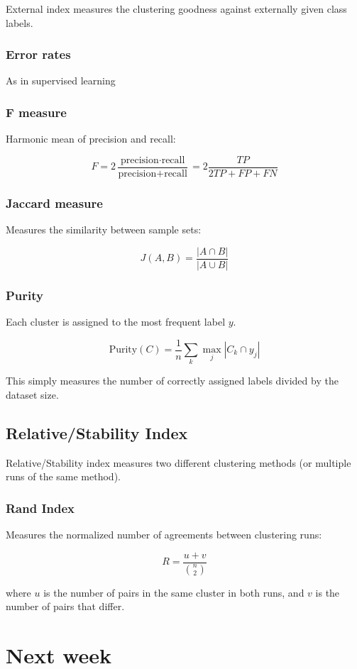 \documentclass{idc_msc}
\begin{document}
External index measures the clustering goodness against externally given class labels.

\subsubsection{Error rates}

As in supervised learning

\subsubsection{F measure}

Harmonic mean of precision and recall:

\[F = 2 \frac{\text{precision} \cdot \text{recall}}{\text{precision} + \text{recall}} = 2 \frac{TP}{2TP + FP + FN}\]

\subsubsection{Jaccard measure}

Measures the similarity between sample sets:

\[J(A,B) = \frac{|A \cap B|}{|A \cup B|}\]

\subsubsection{Purity}

Each cluster is assigned to the most frequent label \(y\).

\[\text{Purity}(C) = \frac{1}{n} \sum_k \max_j |C_k \cap y_j|\]

This simply measures the number of correctly assigned labels divided by the dataset size.

\subsection{Relative/Stability Index}

Relative/Stability index measures two different clustering methods (or multiple runs of the same method).

\subsubsection{Rand Index}

Measures the normalized number of agreements between clustering runs:

\[R = \frac{u+v}{\binom{n}{2}}\]

where \(u\) is the number of pairs in the same cluster in both runs, and \(v\) is the number of pairs that differ.

\section{Next week}
\end{document}
